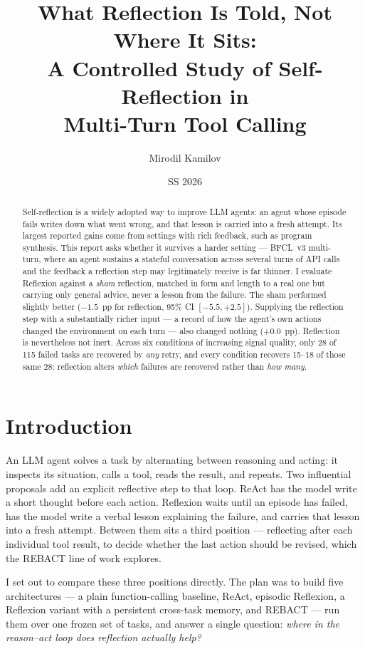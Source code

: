\documentclass[a4paper, 12pt]{article}
\title{What Reflection Is Told, Not Where It Sits:\\
A Controlled Study of Self-Reflection in\\
Multi-Turn Tool Calling}
\author{Mirodil Kamilov}
\date{SS 2026}
\begin{document}
\maketitle

\begin{abstract}
\noindent
Self-reflection is a widely adopted way to improve LLM agents: an agent whose
episode fails writes down what went wrong, and that lesson is carried into a
fresh attempt. Its largest reported gains come from settings with rich feedback,
such as program synthesis. This report asks whether it survives a
harder setting --- BFCL~v3 multi-turn, where an agent sustains a stateful
conversation across several turns of API calls and the feedback a reflection
step may legitimately receive is far thinner. I evaluate Reflexion against a
\emph{sham} reflection, matched in form and length to a real one but carrying
only general advice, never a lesson from the failure. The sham performed slightly better
($-1.5$~pp for reflection, 95\% CI $[-5.5,+2.5]$). Supplying the reflection step
with a substantially richer input --- a record of how the agent's own actions changed
the environment on each turn --- also changed nothing ($+0.0$~pp). Reflection is nevertheless
not inert. Across six conditions of increasing signal quality, only 28 of 115 failed tasks
are recovered by \emph{any} retry, and every condition recovers 15--18 of those same 28:
reflection alters \emph{which} failures are recovered rather than \emph{how many}.
\end{abstract}

\section{Introduction}

An LLM agent solves a task by alternating between reasoning and acting: it
inspects its situation, calls a tool, reads the result, and repeats. Two
influential proposals add an explicit reflective step to that loop. ReAct
\cite{yao2023react} has the model write a short thought before each action.
Reflexion \cite{shinn2023reflexion} waits until an episode has failed, has the
model write a verbal lesson explaining the failure, and carries that lesson into
a fresh attempt. Between them sits a third position --- reflecting after each
individual tool result, to decide whether the last action should be revised,
which the REBACT \cite{zeng2025rebact} line of work explores.

I set out to compare these three positions directly. The plan was to build five
architectures --- a plain function-calling baseline, ReAct, episodic Reflexion,
a Reflexion variant with a persistent cross-task memory, and REBACT --- run them
over one frozen set of tasks, and answer a single question: \emph{where in the
reason--act loop does reflection actually help?}
\end{document}
